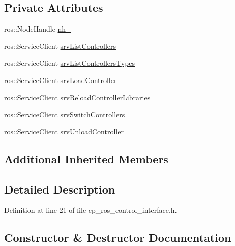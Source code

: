 \subsection*{Private Attributes}
\begin{DoxyCompactItemize}
\item 
ros\+::\+Node\+Handle \hyperlink{classsmacc_1_1components_1_1CpRosControlInterface_a58b15bd11d13cb02813232c6e50adbd2}{nh\+\_\+}
\item 
ros\+::\+Service\+Client \hyperlink{classsmacc_1_1components_1_1CpRosControlInterface_aec2d2eb63ad4f04741493329e6c33696}{srv\+List\+Controllers}
\item 
ros\+::\+Service\+Client \hyperlink{classsmacc_1_1components_1_1CpRosControlInterface_a5a4983fca48da646b5fc94ce1f0e4114}{srv\+List\+Controllers\+Types}
\item 
ros\+::\+Service\+Client \hyperlink{classsmacc_1_1components_1_1CpRosControlInterface_aa6c1440534d6a825644f0c3620461b72}{srv\+Load\+Controller}
\item 
ros\+::\+Service\+Client \hyperlink{classsmacc_1_1components_1_1CpRosControlInterface_afdfece75d6aa438fae728e72add50e16}{srv\+Reload\+Controller\+Libraries}
\item 
ros\+::\+Service\+Client \hyperlink{classsmacc_1_1components_1_1CpRosControlInterface_a78e45e68567c23ca5c19df0de257c20f}{srv\+Switch\+Controllers}
\item 
ros\+::\+Service\+Client \hyperlink{classsmacc_1_1components_1_1CpRosControlInterface_a0515a2a86bfcd0fdec08fabd3070723c}{srv\+Unload\+Controller}
\end{DoxyCompactItemize}
\subsection*{Additional Inherited Members}


\subsection{Detailed Description}


Definition at line 21 of file cp\+\_\+ros\+\_\+control\+\_\+interface.\+h.



\subsection{Constructor \& Destructor Documentation}
\mbox{\label{classsmacc_1_1components_1_1CpRosControlInterface_a0748ed325fd16e4ce28650a4c4851337}} 
